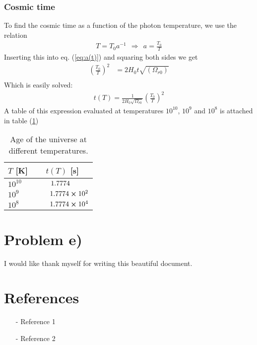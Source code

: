 \documentclass[reprint,english,notitlepage]{revtex4-1}  %
\numberwithin{equation}{section}
\begin{document}
\subsubsection{Cosmic time}
To find the cosmic time as a function of the photon temperature, we use the
relation
\begin{align}
	T = T_0 a^{-1} \ \ \Rightarrow \ \ a = \frac{T_0}{T}
\end{align}
Inserting this into eq. (\ref{eq:a(t)}) and squaring both sides we get
\begin{align}
	\left(\frac{T_0}{T}\right)^2 &= 2 H_0 t \sqrt{(\Omega_{r0})} \\
\end{align}
Which is easily solved:
\begin{align}
	t(T) = \frac{1}{2 H_0 \sqrt{\Omega_{r0}}} \left(\frac{T_0}{T}\right)^2
\end{align}
A table of this expression evaluated at temperatures $10^10$, $10^9$ and $10^8$
is attached in table (\ref{tab:t(T)})

\begin{table}[h!]
	\begin{tabular}{lc}
	\hline
	      $T$ [K] &   $t(T)$ [s] \\
	\hline
	\hline
	 $10^{10}$ 			& $\ \ \ \ \ \ 1.7774 \hspace{0.91cm} $ \\
	 $10^9$    			& $\ \ \ \ \ \ 1.7774\cross 10^2$ \\
	 $10^8$    			& $\ \ \ \ \ \ 1.7774\cross 10^4$ \\
	\hline
	\hline
	\end{tabular}
	\caption{Age of the universe at different temperatures.}
	\label{tab:t(T)}
\end{table}

\section{Problem e)}


\begin{acknowledgments}  %
I would like thank myself for writing this beautiful document.
\end{acknowledgments}


\section*{References}  %
\begin{itemize}
\item[-]Reference 1
\item[-]Reference 2
\end{itemize}
\end{document}
